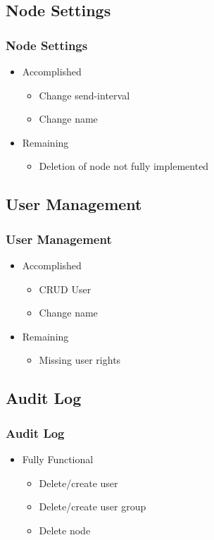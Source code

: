 \documentclass[aspectratio=1610,20pt,utf8]{beamer}
\begin{document}

\subsection{Node Settings}
\begin{frame}
\frametitle{Node Settings}
\begin{itemize}
	\item Accomplished
	\begin{itemize}
		\item Change send-interval
		\item Change name
	\end{itemize}
	\item Remaining
	\begin{itemize}
		\item Deletion of node not fully implemented
	\end{itemize}
\end{itemize}
\end{frame}


\subsection{User Management}
\begin{frame}
\frametitle{User Management}
\begin{itemize}
	\item Accomplished
	\begin{itemize}
		\item CRUD User
		\item Change name
	\end{itemize}
	\item Remaining
	\begin{itemize}
		\item Missing user rights
	\end{itemize}
\end{itemize}

\end{frame}


\subsection{Audit Log}
\begin{frame}
\frametitle{Audit Log}
\begin{itemize}
	\item Fully Functional
	\begin{itemize}
		\item Delete/create user 
		\item Delete/create user group
		\item Delete node
	\end{itemize}
\end{itemize}

\end{frame}
\end{document}
